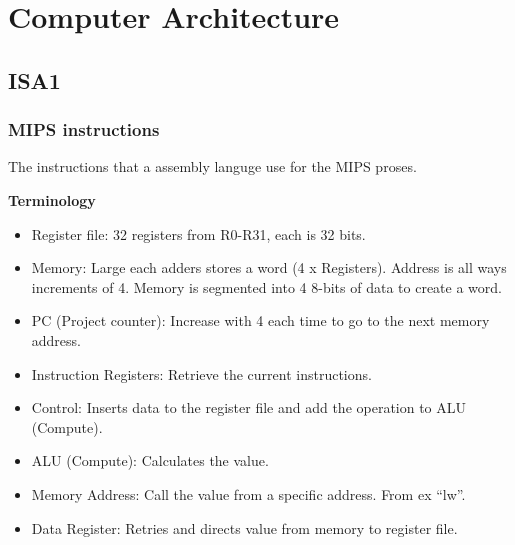 \chapter{Computer Architecture}

\newpage

\section{ISA1}
\subsection{MIPS instructions}
The instructions that a assembly languge use for the MIPS proses.

\noindent\textbf{Terminology} \newline
\begin{itemize}
\item  Register file: 32 registers from R0-R31, each is 32 bits.
\item  Memory: Large each adders stores a word (4 x Registers). Address is all ways increments of 4.
       Memory is segmented into 4 8-bits of data to create a word.
\item  PC (Project counter): Increase with 4 each time to go to the next memory address.
\item  Instruction Registers: Retrieve the current instructions.
\item  Control: Inserts data to the register file and add the operation to ALU (Compute).
\item  ALU (Compute): Calculates the value.
\item  Memory Address: Call the value from a specific address. From ex ``lw''.
\item  Data Register: Retries and directs value from memory to register file.
\end{itemize}

\newpage

